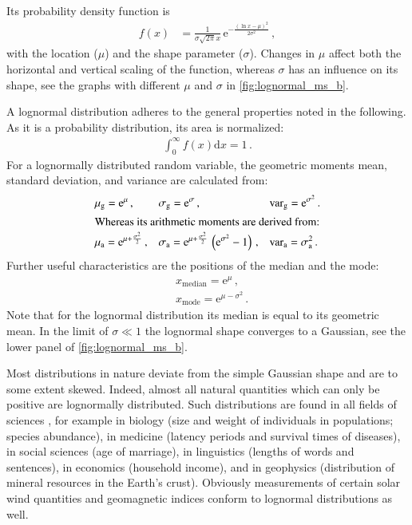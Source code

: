 Its probability density function is
\begin{align}
	f(x) &= \frac{1}{\sigma \sqrt{2 \pi} x} \, \text{e}^{- \frac{(\ln x - \mu)^2}{2 \sigma^2}}	\,,
\end{align}
with the location ($\mu$) and the shape parameter ($\sigma$). Changes in $\mu$ affect both the horizontal and vertical scaling of the function, whereas $\sigma$ has an influence on its shape, see the graphs with different $\mu$ and $\sigma$ in \autoref{fig:lognormal_ms_b}.

A lognormal distribution adheres to the general properties noted in the following. As it is a probability distribution, its area is normalized:
\begin{align*}
	\int_0^\infty f(x) \text{d} x = 1	\,.
\end{align*}
For a lognormally distributed random variable, the geometric moments mean, standard deviation, and variance are calculated from:
\begin{align*}
	&\mu_\text{g} = \text{e}^\mu	\,,	&	&\sigma_\text{g} = \text{e}^\sigma	\,,	&	&\text{var}_\text{g} = \text{e}^{\sigma^2}	\,.\\
	\intertext{Whereas its arithmetic moments are derived from:}
	&\mu_\text{a} = \text{e}^{\mu + \frac{\sigma^2}{2}}	\,,	&	&\sigma_\text{a} = \text{e}^{\mu + \frac{\sigma^2}{2}} \, \left(\text{e}^{\sigma^2} - 1\right)	\,,	&	&\text{var}_\text{a} = \sigma_\text{a}^2\,.
\end{align*}
Further useful characteristics are the positions of the median and the mode:
\begin{align*}
	&x_\text{median} = \text{e}^{\mu}	\,,\\
	&x_\text{mode} = \text{e}^{\mu - \sigma^2}	\,.
\end{align*}
Note that for the lognormal distribution its median is equal to its geometric mean. In the limit of $\sigma \ll 1$ the lognormal shape converges to a Gaussian, see the lower panel of \autoref{fig:lognormal_ms_b}.

Most distributions in nature deviate from the simple Gaussian shape and are to some extent skewed. Indeed, almost all natural quantities which can only be positive are lognormally distributed. Such distributions are found in all fields of sciences \citep{Limpert2001}, for example in biology (size and weight of individuals in populations; species abundance), in medicine (latency periods and survival times of diseases), in social sciences (age of marriage), in linguistics (lengths of words and sentences), in economics (household income), and in geophysics (distribution of mineral resources in the Earth's crust). Obviously measurements of certain solar wind quantities and geomagnetic indices conform to lognormal distributions as well.


